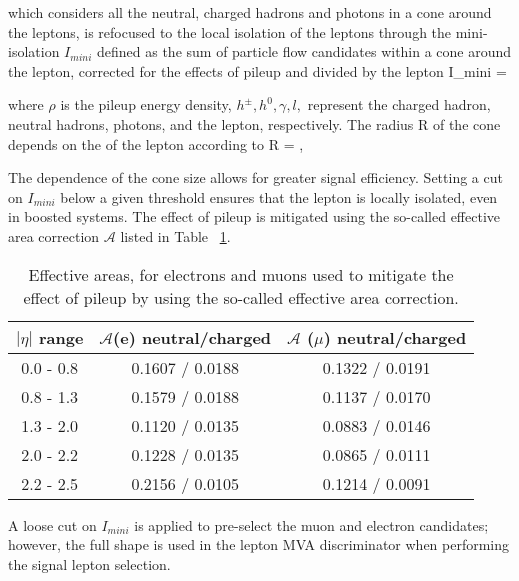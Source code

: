 \noindent which considers all the neutral, charged hadrons and photons in a cone around the leptons, is refocused to the local isolation of the leptons through the mini-isolation $I_{mini}$ \cite{i_mini} defined as the sum of particle flow candidates \pt within a cone around the lepton, corrected for the effects of pileup and divided by the lepton \pt
\beqn
I_{mini} =
\eeqn

\noindent where $\rho$ is the pileup energy density, $h^\pm, h^0, \gamma, l,$ represent the charged hadron, neutral hadrons, photons, and the lepton, respectively. The radius R of the cone depends on the \pt of the lepton according to 
\beqn
R = ,
\eeqn

The \pt dependence of the cone size allows for greater signal efficiency. Setting a cut on $I_{mini}$ below a given threshold ensures that the lepton is locally isolated, even in boosted systems. The effect of pileup is mitigated using the so-called effective area correction $\mathcal{A}$ listed in Table ~\ref{tab:pileup_area}. 

\begin{table}[!htbp]
\centering
\small
\begin{tabular}{ccc}\hline
$|\eta|$ range & $\mathcal{A}$(e) neutral/charged & $\mathcal{A}$ ($\mu$) neutral/charged \\\hline
0.0 - 0.8      & 0.1607 / 0.0188                  & 0.1322 / 0.0191 \\
0.8 - 1.3      & 0.1579 / 0.0188                  & 0.1137 / 0.0170 \\
1.3 - 2.0      & 0.1120 / 0.0135                  & 0.0883 / 0.0146 \\
2.0 - 2.2      & 0.1228 / 0.0135                  & 0.0865 / 0.0111 \\
2.2 - 2.5      & 0.2156 / 0.0105                  & 0.1214 / 0.0091 \\ \hline
\end{tabular}
\caption[Effective areas, for electrons and muons.]{ Effective areas, for electrons and muons used to mitigate the effect of pileup by using the so-called effective area correction.}
\label{tab:pileup_area}
\end{table}

A loose cut on $I_{mini}$ is applied to pre-select the muon and electron candidates; however, the full shape is used in the lepton MVA discriminator when performing the signal lepton selection.

